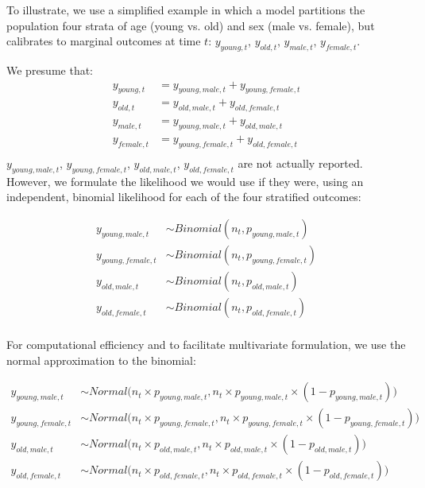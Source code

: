 \documentclass{article}
\begin{document}
To illustrate, we use a simplified example in which a model partitions the population four strata of age (young vs. old) and sex (male vs. female), but calibrates to marginal outcomes at time $t$: $y_{young,t}$, $y_{old,t}$, $y_{male,t}$, $y_{female,t}$.

We presume that:
\begin{align*}
	y_{young,t} &= y_{young,male,t} + y_{young,female,t}\\
	y_{old,t} &= y_{old,male,t} + y_{old,female,t}\\
	y_{male,t} &= y_{young,male,t} + y_{old,male,t}\\
	y_{female,t} &= y_{young,female,t} + y_{old,female,t}\\
\end{align*}
$y_{young,male,t}$, $y_{young,female,t}$, $y_{old,male,t}$, $y_{old,female,t}$ are not actually reported. However, we formulate the likelihood we would use if they were, using an independent, binomial likelihood for each of the four stratified outcomes:

\begin{align*}
	y_{young,male,t} &\sim Binomial(n_t, p_{young,male,t}) \\
	y_{young,female,t} &\sim Binomial(n_t, p_{young,female,t}) \\
	y_{old,male,t} &\sim Binomial(n_t, p_{old,male,t}) \\
	y_{old,female,t} &\sim Binomial(n_t, p_{old,female,t}) \\
\end{align*}

For computational efficiency and to facilitate multivariate formulation, we use the normal approximation to the binomial:

\begin{align*}
	y_{young,male,t} &\sim Normal\big(n_t \times p_{young,male,t}, n_t \times p_{young,male,t} \times (1-p_{young,male,t})\big) \\
	y_{young,female,t} &\sim Normal\big(n_t \times p_{young,female,t}, n_t \times p_{young,female,t} \times (1-p_{young,female,t})\big) \\
	y_{old,male,t} &\sim Normal\big(n_t \times p_{old,male,t}, n_t \times p_{old,male,t} \times (1-p_{old,male,t})\big) \\
	y_{old,female,t} &\sim Normal\big(n_t \times p_{old,female,t}, n_t \times p_{old,female,t} \times (1-p_{old,female,t})\big) \\
\end{align*}
\end{document}
